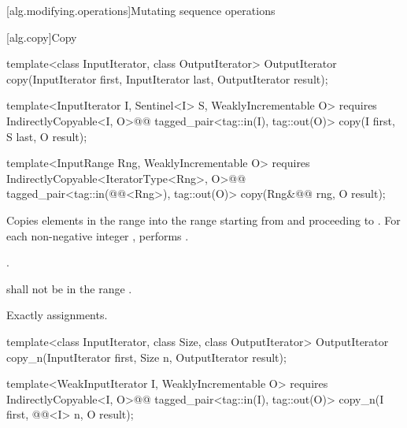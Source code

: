 [alg.modifying.operations]{Mutating sequence operations}

[alg.copy]{Copy}

%
\begin{removedblock}
\begin{itemdecl}
template<class InputIterator, class OutputIterator>
  OutputIterator copy(InputIterator first, InputIterator last,
                      OutputIterator result);
\end{itemdecl}
\end{removedblock}
\begin{addedblock}
\begin{itemdecl}
template<InputIterator I, Sentinel<I> S, WeaklyIncrementable O>
  requires IndirectlyCopyable<I, O>@\newtxt{()}@
  tagged_pair<tag::in(I), tag::out(O)>
    copy(I first, S last, O result);

template<InputRange Rng, WeaklyIncrementable O>
  requires IndirectlyCopyable<IteratorType<Rng>, O>@\newtxt{()}@
  tagged_pair<tag::in(@@<Rng>), tag::out(O)>
    copy(Rng&@\newtxt{\&}@ rng, O result);
\end{itemdecl}
\end{addedblock}

\begin{itemdescr}
\pnum
\effects Copies elements in the range  into the range
 starting from  and
proceeding to . For each non-negative integer
, performs .

\pnum
\returns {}.

\pnum
\requires {} shall not be in the range .

\pnum
\complexity Exactly  assignments.
\end{itemdescr}

%
\begin{removedblock}
\begin{itemdecl}
template<class InputIterator, class Size, class OutputIterator>
  OutputIterator copy_n(InputIterator first, Size n,
                        OutputIterator result);
\end{itemdecl}
\end{removedblock}
\begin{addedblock}
\begin{itemdecl}
template<WeakInputIterator I, WeaklyIncrementable O>
  requires IndirectlyCopyable<I, O>@\newtxt{()}@
  tagged_pair<tag::in(I), tag::out(O)>
    copy_n(I first, @@<I> n, O result);
\end{itemdecl}
\end{addedblock}


